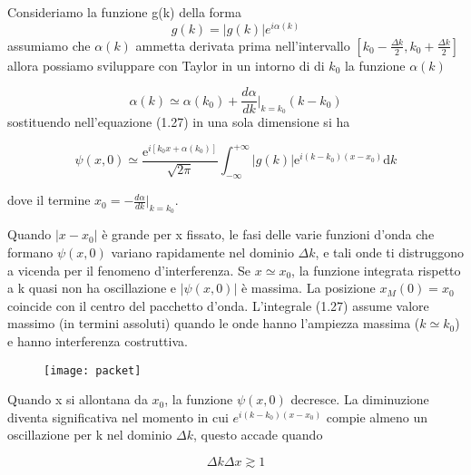 \noindent Consideriamo la funzione g(k) della forma \begin{equation*}
	g(k) = |g(k)|e^{i\alpha(k)}
\end{equation*}
assumiamo che $\alpha(k)$ ammetta derivata prima nell'intervallo $\left [k_0-\frac{\Delta k}{2}, k_0 + \frac{\Delta k}{2} \right ]$ allora possiamo sviluppare con Taylor in un intorno di di $k_0$ la funzione $\alpha(k)$

\begin{equation*}
	\alpha(k) \simeq \alpha(k_0) + \frac{d \alpha}{dk} \Big \vert_{k = k_0}(k-k_0)
\end{equation*}
sostituendo nell'equazione (1.27) in una sola dimensione si ha 

\begin{equation}
\psi(x, 0) \simeq \frac{\mathrm{e}^{i\left[k_0 x+\alpha\left(k_0\right)\right]}}{\sqrt{2 \pi}} \int_{-\infty}^{+\infty}|g(k)| \mathrm{e}^{i\left(k-k_0\right)\left(x-x_0\right)} \mathrm{d} k	
\end{equation}

dove il termine $x_0 = -\frac{d \alpha}{dk} \Big \vert_{k = k_0}$.
\newline

\noindent Quando $|x-x_0|$ \`e grande per x fissato, le fasi delle varie funzioni d'onda che formano $\psi(x,0)$ variano rapidamente nel dominio $\Delta k$, e tali onde ti distruggono a vicenda per il fenomeno d'interferenza. Se $x \simeq x_0$, la funzione integrata rispetto a k quasi non ha oscillazione e  $|\psi(x,0)|$ \`e massima.
La posizione $x_M(0) = x_0 $ coincide con il centro del pacchetto d'onda. L'integrale (1.27) assume valore massimo (in termini assoluti) quando le onde hanno l'ampiezza massima ($k \simeq k_0$) e hanno interferenza costruttiva. 
\newline
 
\begin{figure}[ht]
\vspace{0.1in}
\texttt{[image: packet]}	
\centering
\vspace{0.1in}
\caption{}
\end{figure}

\noindent Quando x si allontana da $x_0$, la funzione $\psi(x,0)$ decresce. La diminuzione diventa significativa nel momento in cui $e^{i(k-k_0)(x-x_0)}$ compie almeno un oscillazione per k nel dominio $\Delta k$, questo accade quando

\begin{equation}
	\Delta k \Delta x \gtrsim 1
\end{equation} 

